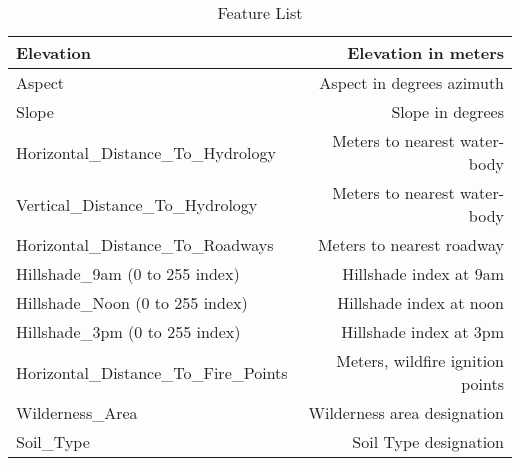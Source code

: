 \begin{table}
  \begin{tabular}{ l | r }
    \hline
    Elevation & Elevation in meters \\
    \hline
    Aspect & Aspect in degrees azimuth \\
    \hline
    Slope & Slope in degrees \\
    \hline
    Horizontal\_Distance\_To\_Hydrology & Meters to nearest water-body \\
    \hline
    Vertical\_Distance\_To\_Hydrology & Meters to nearest water-body \\
    \hline
    Horizontal\_Distance\_To\_Roadways & Meters to nearest roadway \\
    \hline
    Hillshade\_9am (0 to 255 index) & Hillshade index at 9am \\
    \hline
    Hillshade\_Noon (0 to 255 index) & Hillshade index at noon \\
    \hline
    Hillshade\_3pm (0 to 255 index) & Hillshade index at 3pm \\
    \hline
    Horizontal\_Distance\_To\_Fire\_Points & Meters, wildfire ignition points \\
    \hline
    Wilderness\_Area & Wilderness area designation \\
    \hline
    Soil\_Type & Soil Type designation \\
    \hline
  \end{tabular}
  \caption{Feature List}
  \label{table:featurelist}
\end{table}


